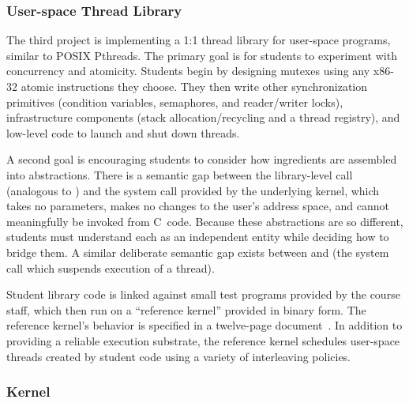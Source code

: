 \subsubsection{User-space Thread Library}

The third project is implementing a 1:1 thread library for
user-space programs,
similar to POSIX Pthreads.
The primary goal is
for students to experiment
with concurrency and atomicity.
Students begin by designing mutexes using any
x86-32 atomic instructions they choose.
They then write other synchronization
primitives (condition variables, semaphores,
and reader/writer locks), infrastructure
components (stack allocation/recycling and
a thread registry),
and low-level code to launch and shut down
threads.

A second goal is encouraging students to
consider how ingredients are assembled into
abstractions.
There is a semantic gap
between the library-level 
call (analogous to )
and the  system call provided
by the underlying kernel,
which takes no parameters,
makes no changes to the user's address space,
and cannot meaningfully
be invoked from C~code.
Because these abstractions are so different,
students must
understand each as an independent entity while
deciding how to bridge them.
A similar deliberate semantic gap exists between
 and  (the system call
which suspends execution of a thread).

Student library code is linked against small
test programs provided by the course staff,
which then run on a ``reference kernel'' provided in binary form.
The reference kernel's behavior is specified
in a twelve-page document~\cite{kspec}.
In addition to providing a reliable execution
substrate,
the reference kernel
schedules user-space threads created by
student code using a variety of
interleaving policies.

\subsubsection{\pebbles Kernel}

